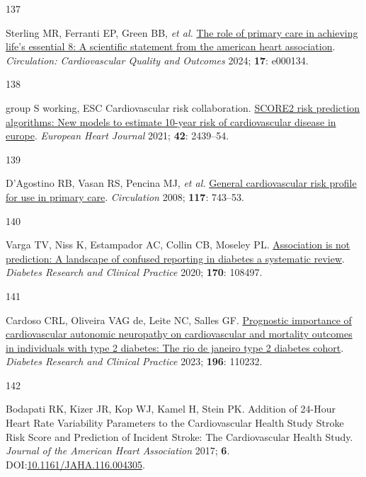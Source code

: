 \documentclass[
  a4paper,
  headsepline=true,
  open=left]{scrbook}
\newlength{\cslhangindent}
\newlength{\csllabelwidth}
\newlength{\cslentryspacingunit} %
\newenvironment{CSLReferences}[2] %
 {%
  \setlength{\parindent}{0pt}
  \ifodd #1
  \let\oldpar\par
  \def\par{\hangindent=\cslhangindent\oldpar}
  \fi
  \setlength{\parskip}{#2\cslentryspacingunit}
 }%
 {}
\newcommand{\CSLLeftMargin}[1]{\parbox[t]{\csllabelwidth}{#1}}
\newcommand{\CSLRightInline}[1]{\parbox[t]{\linewidth - \csllabelwidth}{#1}\break}
\begin{document}
\begin{CSLReferences}{0}{0}
\leavevmode{}%
\CSLLeftMargin{137 }%
\CSLRightInline{Sterling MR, Ferranti EP, Green BB, \emph{et al.}
\href{https://doi.org/10.1161/HCQ.0000000000000134}{The role of primary
care in achieving life{'}s essential 8: A scientific statement from the
american heart association}. \emph{Circulation: Cardiovascular Quality
and Outcomes} 2024; \textbf{17}: e000134.}

\leavevmode{}%
\CSLLeftMargin{138 }%
\CSLRightInline{group S working, ESC Cardiovascular risk collaboration.
\href{https://doi.org/10.1093/eurheartj/ehab309}{SCORE2 risk prediction
algorithms: New models to estimate 10-year risk of cardiovascular
disease in europe}. \emph{European Heart Journal} 2021; \textbf{42}:
2439--54.}

\leavevmode{}%
\CSLLeftMargin{139 }%
\CSLRightInline{D'Agostino RB, Vasan RS, Pencina MJ, \emph{et al.}
\href{https://doi.org/10.1161/CIRCULATIONAHA.107.699579}{General
cardiovascular risk profile for use in primary care}. \emph{Circulation}
2008; \textbf{117}: 743--53.}

\leavevmode{}%
\CSLLeftMargin{140 }%
\CSLRightInline{Varga TV, Niss K, Estampador AC, Collin CB, Moseley PL.
\href{https://doi.org/10.1016/j.diabres.2020.108497}{Association is not
prediction: A landscape of confused reporting in diabetes {\textendash}
a systematic review}. \emph{Diabetes Research and Clinical Practice}
2020; \textbf{170}: 108497.}

\leavevmode{}%
\CSLLeftMargin{141 }%
\CSLRightInline{Cardoso CRL, Oliveira VAG de, Leite NC, Salles GF.
\href{https://doi.org/10.1016/j.diabres.2022.110232}{Prognostic
importance of cardiovascular autonomic neuropathy on cardiovascular and
mortality outcomes in individuals with type 2 diabetes: The rio de
janeiro type 2 diabetes cohort}. \emph{Diabetes Research and Clinical
Practice} 2023; \textbf{196}: 110232.}

\leavevmode{}%
\CSLLeftMargin{142 }%
\CSLRightInline{Bodapati RK, Kizer JR, Kop WJ, Kamel H, Stein PK.
Addition of 24-Hour Heart Rate Variability Parameters to the
Cardiovascular Health Study Stroke Risk Score and Prediction of Incident
Stroke: The Cardiovascular Health Study. \emph{Journal of the American
Heart Association} 2017; \textbf{6}.
DOI:\href{https://doi.org/10.1161/JAHA.116.004305}{10.1161/JAHA.116.004305}.}


\end{CSLReferences}
\end{document}
